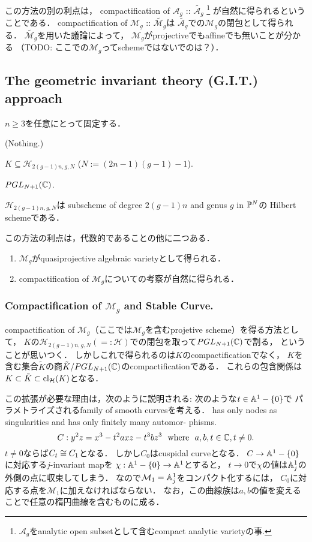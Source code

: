 \documentclass[a4paper]{jsarticle}
\newcommand{\modA}{\mathcal{A}}
\newcommand{\modH}{\mathcal{H}}
\newcommand{\modM}{\mathcal{M}}
\begin{document}
    この方法の別の利点は，
    compactification of $\modA_g$ :: $\tilde{\modA_g}$
    \footnote{ $\modA_g$をanalytic open subsetとして含むcompact analytic varietyの事. }
    が自然に得られるということである．
    compactification of $\modM_g$ :: $\tilde{\modM_g}$は
    $\tilde{\modA_g}$での$\modM_g$の閉包として得られる．
    $\tilde{\modM_g}$を用いた議論によって，
    $\modM_g$がprojectiveでもaffineでも無いことが分かる
    （TODO: ここでの$\modM_g$ってschemeではないでのは？）．

    \subsection{The geometric invariant theory (G.I.T.) approach}
    $n \geq 3$を任意にとって固定する．
    \begin{description}[leftmargin=!,labelwidth=\widthof{\bfseries Container Space}]
        \item[Extra Data] (Nothing.)
        \item[Container Space] $K \subseteq \modH_{2(g-1)n, g, N}$ ($N:=(2n-1)(g-1)-1$).
        \item[Group] $PGL_{N+1}(\mathbb{C})$.
    \end{description}
    $\modH_{2(g-1)n, g, N}$は
    subscheme of degree $2(g-1)n$ and genus $g$ in $\mathbb{P}^N$の
    Hilbert schemeである．

    この方法の利点は，代数的であることの他に二つある．
    \begin{enumerate}
        \item $\modM_g$がquasiprojective algebraic varietyとして得られる．
        \item compactification of $\modM_g$についての考察が自然に得られる．
    \end{enumerate}

    \subsubsection{Compactification of $\modM_g$ and Stable Curve.}
    compactification of $\modM_g$（ここでは$\modM_g$を含むprojetive scheme）を得る方法として，
    $K$の$\modH_{2(g-1)n, g, N}(=:\modH)$での閉包を取って$PGL_{N+1}(\mathbb{C})$で割る，
    ということが思いつく．
    しかしこれで得られるのは$K$のcompactificationでなく，
    $K$を含む集合$\tilde{K}$の商$\tilde{K}/PGL_{N+1}(\mathbb{C})$のcompactificationである．
    これらの包含関係は$K \subset \tilde{K} \subset \cl_{\modH}(K)$となる．
    
    この拡張が必要な理由は，次のように説明される:
    次のような$t \in \mathbb{A}^1-\{0\}$で
    パラメトライズされるfamily of smooth curvesを考える．
    has only nodes as singularities and has only finitely many automor-
    phisms.
    \[ C: y^2z=x^3-t^2axz-t^3bz^3 ~~\text{where}~~ a,b,t \in \mathbb{C}, t \neq 0. \]
    $t \neq 0$ならば$C_t \cong C_1$となる．
    しかし$C_0$はcuspidal curveとなる．
    $C \to \mathbb{A}^1-\{0\}$に対応する$j$-invariant mapを
    $\chi: \mathbb{A}^1-\{0\} \to \mathbb{A}^1$とすると，
    $t \to 0$で$\chi$の値は$\mathbb{A}^1_j$の外側の点に収束してしまう．
    なので$\modM_1=\affine^1_j$をコンパクト化するには，
    $C_0$に対応する点を$\modM_1$に加えなければならない．
    なお，この曲線族は$a,b$の値を変えることで任意の楕円曲線を含むものに成る．
\end{document}
